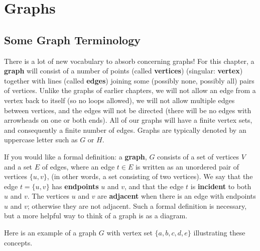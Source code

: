 \chapter{Graphs}\label{ch:Graphs}


\section{Some Graph Terminology} There is a lot of new vocabulary to absorb concerning graphs!
For this chapter, a {\bfseries graph} will consist of a number of points (called {\bfseries vertices}) (singular: {\bfseries vertex}) together with
lines (called {\bfseries edges}) joining some (possibly none, possibly all) pairs of vertices. Unlike the graphs of earlier chapters, we will not allow an edge from a vertex back to itself (so no loops allowed), we will not allow multiple edges between vertices, and the edges will not be directed (there will be no edges with arrowheads on one or both ends).  All of our graphs will have a finite vertex sets, and consequently a finite number of edges. Graphs are typically denoted by an uppercase letter such as $G$ or $H$.


If you would like a formal definition:
 a {\bfseries {graph}}, $G$ consists of a set of vertices $V$ and a set $E$ of edges, where
an edge $t\in E$ is written as an unordered pair of vertices $\{u,v\}$, (in other words, a set consisting of two  vertices). We say that the edge $t= \{u,v\}$ has {\bfseries endpoints} $u$ and $v$, and that the edge $t$ 
is {\bfseries {incident}} to both $u$ and $v$. The vertices $u$ and $v$ are {\bfseries {adjacent}} when there is an edge with endpoints $u$ and $v$; otherwise they are not adjacent.  Such a formal definition is necessary, but a more helpful way to think of a graph is as a diagram.

Here is an example of a graph $G$ with vertex set $\{a,b,c,d,e\}$ illustrating these concepts.

\begin{center}
\end{center}

